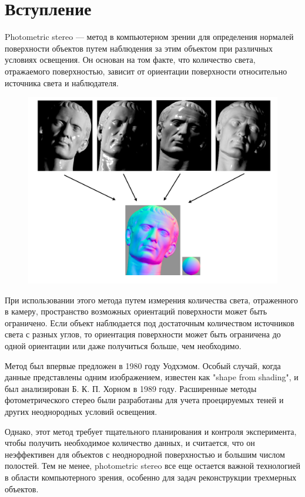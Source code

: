 \section{Вступление}

Photometric stereo — метод в компьютерном зрении для определения
нормалей поверхности объектов путем наблюдения за этим объектом
при различных условиях освещения. Он основан на том факте,
что количество света, отражаемого поверхностью, зависит от ориентации
поверхности относительно источника света и наблюдателя.

\begin{figure}[h]
  \centering
  \includegraphics[scale=0.3]{tex/example.png}
\end{figure}

При использовании этого метода путем измерения количества света,
отраженного в камеру, пространство возможных ориентаций поверхности может
быть ограничено. Если объект наблюдается под достаточным количеством источников
света с разных углов, то ориентация поверхности может быть ограничена
до одной ориентации или даже получиться больше, чем необходимо.

Метод был впервые предложен в 1980 году Уодхэмом. Особый случай,
когда данные представлены одним изображением, известен как "shape from shading",
и был анализирован Б. К. П. Хорном в 1989 году. Расширенные методы фотометрического
стерео были разработаны для учета проецируемых теней и других
неоднородных условий освещения.

Однако, этот метод требует тщательного планирования и контроля эксперимента,
чтобы получить необходимое количество данных, и считается,
что он неэффективен для объектов с неоднородной поверхностью
и большим числом полостей. Тем не менее, photometric stereo все еще остается
важной технологией в области компьютерного зрения, особенно для задач
реконструкции трехмерных объектов.
